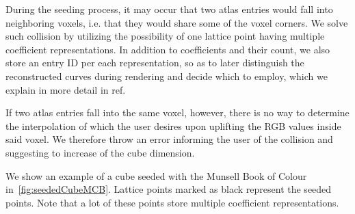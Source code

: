 During the seeding process, it may occur that two atlas entries would fall into neighboring voxels, i.e. that they would share some of the voxel corners. We solve such collision by utilizing the possibility of one lattice point having multiple coefficient representations. In addition to coefficients and their count, we also store an entry ID per each representation, so as to later distinguish the reconstructed curves during rendering and decide which to employ, which we explain in more detail in ref.

If two atlas entries fall into the same voxel, however, there is no way to determine the interpolation of which the user desires upon uplifting the RGB values inside said voxel. We therefore throw an error informing the user of the collision and suggesting to increase of the cube dimension.

We show an example of a cube seeded with the Munsell Book of Colour in~\cref{fig:seededCubeMCB}. Lattice points marked as black represent the seeded points. Note that a lot of these points store multiple coefficient representations.

